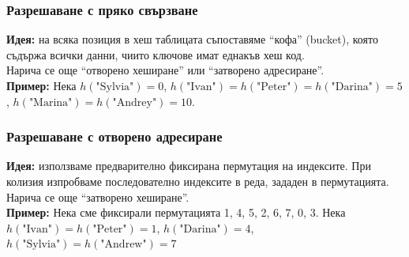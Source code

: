 \documentclass[alsotrans]{beamerswitch}
\begin{document}
\begin{frame}
  \frametitle{Разрешаване с пряко свързване}
  \textbf{Идея:} на всяка позиция в хеш таблицата съпоставяме ``кофа'' (bucket), която съдържа всички данни, чиито ключове имат еднакъв хеш код.\\
  \pause
  Нарича се още ``отворено хеширане'' или ``затворено адресиране''.\\
  \pause
  \textbf{Пример:} Нека $h(\text{"Sylvia"{}}) = 0$, $h(\text{"Ivan"{}}) = h(\text{"Peter"{}}) = h(\text{"Darina"{}}) = 5$, $h(\text{"Marina"{}}) = h(\text{"Andrey"{}}) = 10$.
  \begin{center}
    \small
  \end{center}
\end{frame}

\begin{frame}
  \frametitle{Разрешаване с отворено адресиране}
  \textbf{Идея:} използваме предварително фиксирана пермутация на индексите. При колизия изпробваме последователно индексите в реда, зададен в пермутацията.\\[1em]
  \pause
  Нарича се още ``затворено хеширане''.\\[1em]
  \pause
  \textbf{Пример:} Нека сме фиксирали пермутацията 1, 4, 5, 2, 6, 7, 0, 3.
  Нека $h(\text{"Ivan"{}}) = h(\text{"Peter"{}}) = 1$, $h(\text{"Darina"{}}) = 4$, $h(\text{"Sylvia"{}}) = h(\text{"Andrew"{}}) = 7$
  \begin{center}
    \small
  \end{center}
\end{frame}
\end{document}
